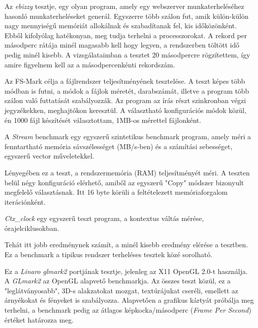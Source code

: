 
Az \textit{ebizzy} tesztje, egy olyan program, amely egy webszerver munkaterheléséhez hasonló munkaterheléseket generál. Egyszerre több szálon fut, amik külön-külön nagy mennyiségű memóriát allokálnak és szabadítanak fel, kis időközönként. Ebből kifolyólag hatékonyan, meg tudja terhelni a processzorokat. A rekord per másodperc rátája minél magasabb kell hogy legyen, a rendszerben töltött idő pedig minél kisebb. A vizsgálataimban a tesztet 20 másodpercre rögzítettem, így amire figyelnem kell az a másodpercenkénti rekordszám.


Az FS-Mark célja a fájlrendszer teljesítményének tesztelése.
A teszt képes több módban is futni, a módok a fájlok méretét, darabszámát, illetve a program több szálon való futtatását szabályozzák. 
Az program az írás részt szinkronban végzi jegyzékekken, meghajtókon keresztül.
A választható konfigurációs módok közül, én 1000 fájl készítését választottam, 1MB-os mérettel fájlonként.


A \textit{Stream} benchmark egy egyszerű szintetikus benchmark program, amely méri a fenntartható memória sávszélességet (MB/s-ben) és a számítási sebességet, egyszerű vector műveletekkel.

Lényegében ez a teszt, a rendszermemória (RAM) teljesítményét méri.
A teszten belül négy konfiguráció elérhető, amiből az egyszerű "Copy" módszer bizonyult megfelelő választásnak.
Itt 16 byte körüli a feltételezett memóriaforgalom iterációnként.


\textit{Ctx\_clock} egy egyszerű teszt program, a kontextus váltás mérése, órajelciklusokban.

Tehát itt jobb eredménynek számít, a minél kisebb eredmény elérése a tesztben.
Ez a benchmark a tipikus rendszer terheléses tesztek közé sorolható.


Ez a \textit{Linaro glmark2} portjának tesztje, jelenleg az X11 OpenGL 2.0-t használja. A \textit{GLmark2} az OpenGL alapvető benchmarkja. Az összes teszt közül, ez a "leglátványosabb", 3D-s alakzatokat mozgat, textúrájukat cseréli, emellett az árnyékokat és fényeket is szabályozza.
Alapvetően a grafikus kártyát próbálja meg terhelni, a benchmark pedig az átlagos képkocka/másodperc (\textit{Frame Per Second}) értéket határozza meg.

